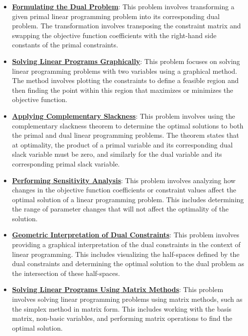 \documentclass{article}%
\begin{document}
\begin{itemize}[leftmargin=*]
\item \href{https://www.math.purdue.edu/~yipn/421/2024-12-03-Duality.pdf#page=1}{\textbf{Formulating the Dual Problem}}: This problem involves transforming a given primal linear programming problem into its corresponding dual problem. The transformation involves transposing the constraint matrix and swapping the objective function coefficients with the right-hand side constants of the primal constraints. %
\item \href{https://www.math.purdue.edu/~yipn/421/2024-12-03-Duality.pdf#page=3}{\textbf{Solving Linear Programs Graphically}}: This problem focuses on solving linear programming problems with two variables using a graphical method. The method involves plotting the constraints to define a feasible region and then finding the point within this region that maximizes or minimizes the objective function. %
\item \href{https://www.math.purdue.edu/~yipn/421/2024-12-03-Duality.pdf#page=2}{\textbf{Applying Complementary Slackness}}: This problem involves using the complementary slackness theorem to determine the optimal solutions to both the primal and dual linear programming problems. The theorem states that at optimality, the product of a primal variable and its corresponding dual slack variable must be zero, and similarly for the dual variable and its corresponding primal slack variable. %
\item \href{https://www.math.purdue.edu/~yipn/421/2024-12-03-Duality.pdf#page=11}{\textbf{Performing Sensitivity Analysis}}: This problem involves analyzing how changes in the objective function coefficients or constraint values affect the optimal solution of a linear programming problem. This includes determining the range of parameter changes that will not affect the optimality of the solution. %
\item \href{https://www.math.purdue.edu/~yipn/421/2024-12-03-Duality.pdf#page=9}{\textbf{Geometric Interpretation of Dual Constraints}}: This problem involves providing a graphical interpretation of the dual constraints in the context of linear programming. This includes visualizing the half-spaces defined by the dual constraints and determining the optimal solution to the dual problem as the intersection of these half-spaces. %
\item \href{https://www.math.purdue.edu/~yipn/421/2024-12-03-Duality.pdf#page=22}{\textbf{Solving Linear Programs Using Matrix Methods}}: This problem involves solving linear programming problems using matrix methods, such as the simplex method in matrix form. This includes working with the basis matrix, non-basic variables, and performing matrix operations to find the optimal solution. %
\end{itemize}
\end{document}

